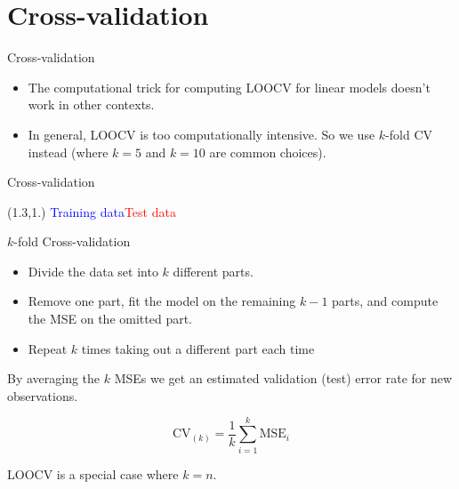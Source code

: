 \documentclass[14pt]{beamer}
\begin{document}
\section{Cross-validation}


\begin{frame}{Cross-validation}

\begin{itemize}
\item The computational trick for computing LOOCV for linear models doesn't work in other contexts.

\item In general, LOOCV is too computationally intensive. So we use $k$-fold CV instead (where $k=5$ and $k=10$ are common choices).
\end{itemize}

\end{frame}


\begin{frame}{Cross-validation}

\begin{textblock}{12}(1.3,1.)
\textcolor{blue}{Training data}\hspace*{4cm}\textcolor{red}{Test data}
\end{textblock}


\end{frame}

\begin{frame}{$k$-fold Cross-validation}

\begin{itemize}
\item Divide the data set into $k$ different parts.
\item Remove one part, fit the model on the remaining
$k-1$ parts, and compute the MSE on the omitted part.
\item Repeat $k$ times taking out a different part each time
\end{itemize}\pause

By averaging the $k$ MSEs we get an estimated
validation (test) error rate for new observations.

\begin{block}{}
\[
\text{CV}_{(k)} = \frac{1}{k}\sum_{i=1}^k \text{MSE}_i
\]
\end{block}\pause

LOOCV is a special case where $k=n$.
\end{frame}
\end{document}
